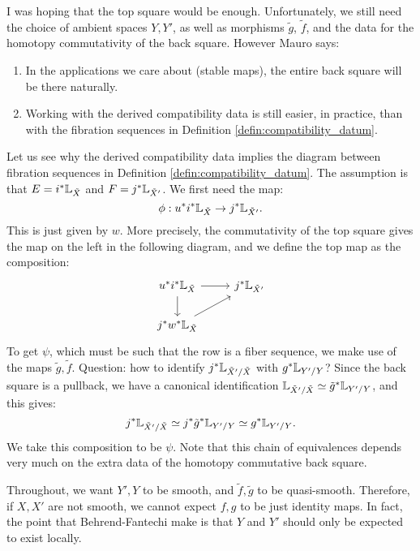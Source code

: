 \begin{rem}
I was hoping that the top square would be enough. Unfortunately, we still need the choice of ambient 
spaces $Y, Y'$, as well as morphisms $\tilde g$, $\tilde f$, and the data for the homotopy commutativity of the back square.
However Mauro says:
\begin{enumerate}
\item In the applications we care about (stable maps), the entire back square will be there naturally.
\item Working with the derived compatibility data is still easier, in practice, than with the fibration sequences in
Definition \ref{defin:compatibility_datum}.
\end{enumerate}
\end{rem}

Let us see why the derived compatibility data implies the diagram between fibration sequences in 
Definition \ref{defin:compatibility_datum}.
The assumption is that $E = i^* \mathbb L_{\tilde X}$ and $F = j^*\mathbb L_{\tilde X'}$. We first need the map:
\[		\phi	: u^* i^* \mathbb L_{\tilde X} \to j^* \mathbb L_{\tilde X'} .	\] 
This is just given by $w$. More precisely, the commutativity of the top square gives the map on the left 
in the following diagram, and we define the top map as the composition:
\[
\begin{tikzcd}
u^*i^*\bbL_{\tilde X}\arrow{r}\arrow{d} & j^* \bbL_{\tilde X'} \\
j^*w^*\bbL_{\tilde X}\arrow{ur} &
\end{tikzcd}
\]
To get $\psi$, which must be such that the row is a fiber sequence, we make use of the maps $\tilde g, \tilde f$.
Question: how to identify $j^*\mathbb L_{\tilde X'/\tilde X} $ with $g^* \mathbb L_{Y'/Y}$? Since the back square is a pullback, we have
a canonical identification $\mathbb L_{\tilde X'/\tilde X}  \simeq \tilde g^* \mathbb L_{Y'/Y}$, and this gives:
\begin{equation}
\label{eq:get_psi}
	j^*\mathbb L_{\tilde X'/\tilde X} \simeq j^*	\tilde g^* \mathbb L_{Y'/Y} \simeq  g^* \mathbb L_{Y'/Y} .
\end{equation}
We take this composition to be $\psi$. Note that this chain of equivalences depends very much on the extra data of
the homotopy commutative back square.

\begin{rem}
Throughout, we want $Y', Y$ to be smooth, and $\tilde f, \tilde g$ to be quasi-smooth. Therefore, if $X, X'$ are not
smooth, we cannot expect $f, g$ to be just identity maps. In fact, the point that Behrend-Fantechi make is that $Y$ and $Y'$ 
should only be expected to exist locally.
\end{rem}

